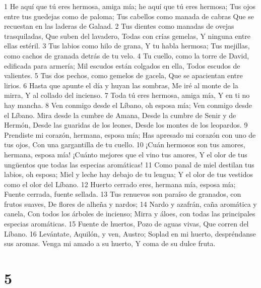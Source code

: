 1 He aquí que tú eres hermosa, amiga mía; he aquí que tú eres hermosa;
Tus ojos entre tus guedejas como de paloma;
Tus cabellos como manada de cabras
Que se recuestan en las laderas de Galaad.
2 Tus dientes como manadas de ovejas trasquiladas,
Que suben del lavadero,
Todas con crías gemelas,
Y ninguna entre ellas estéril.
3 Tus labios como hilo de grana,
Y tu habla hermosa;
Tus mejillas, como cachos de granada detrás de tu velo.
4 Tu cuello, como la torre de David, edificada para armería;
Mil escudos están colgados en ella,
Todos escudos de valientes.
5 Tus dos pechos, como gemelos de gacela,
Que se apacientan entre lirios.
6 Hasta que apunte el día y huyan las sombras,
Me iré al monte de la mirra,
Y al collado del incienso.
7 Toda tú eres hermosa, amiga mía,
Y en ti no hay mancha.
8 Ven conmigo desde el Líbano, oh esposa mía;
Ven conmigo desde el Líbano.
Mira desde la cumbre de Amana,
Desde la cumbre de Senir y de Hermón,
Desde las guaridas de los leones,
Desde los montes de los leopardos.
9 Prendiste mi corazón, hermana, esposa mía;
Has apresado mi corazón con uno de tus ojos,
Con una gargantilla de tu cuello.
10 ¡Cuán hermosos son tus amores, hermana, esposa mía!
¡Cuánto mejores que el vino tus amores,
Y el olor de tus ungüentos que todas las especias aromáticas! 
11 Como panal de miel destilan tus labios, oh esposa;
Miel y leche hay debajo de tu lengua;
Y el olor de tus vestidos como el olor del Líbano.
12 Huerto cerrado eres, hermana mía, esposa mía;
Fuente cerrada, fuente sellada.
13 Tus renuevos son paraíso de granados, con frutos suaves,
De flores de alheña y nardos;
14 Nardo y azafrán, caña aromática y canela,
Con todos los árboles de incienso;
Mirra y áloes, con todas las principales especias aromáticas.
15 Fuente de huertos,
Pozo de aguas vivas,
Que corren del Líbano.
16 Levántate, Aquilón, y ven, Austro;
Soplad en mi huerto, despréndanse sus aromas.
Venga mi amado a su huerto,
Y coma de su dulce fruta.

\chapter{5}

